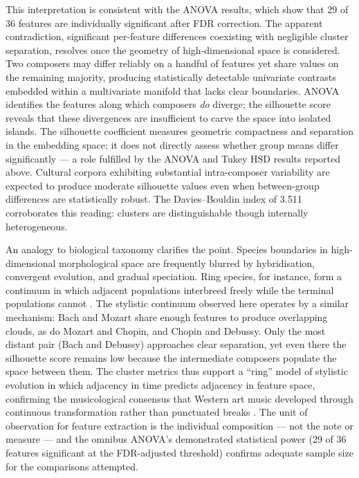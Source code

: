 \documentclass[]{interact}
\theoremstyle{plain}
\theoremstyle{definition}
\theoremstyle{remark}
\begin{document}
This interpretation is consistent with the ANOVA results, which show
that 29 of 36 features are individually significant after FDR
correction. The apparent contradiction, significant per-feature
differences coexisting with negligible cluster separation, resolves
once the geometry of high-dimensional space is considered. Two
composers may differ reliably on a handful of features yet share
values on the remaining majority, producing statistically detectable
univariate contrasts embedded within a multivariate manifold that
lacks clear boundaries. ANOVA identifies the features along which
composers \emph{do} diverge; the silhouette score reveals that
these divergences are insufficient to carve the space into isolated
islands.
The silhouette coefficient measures geometric compactness and separation
in the embedding space; it does not directly assess whether group means
differ significantly --- a role fulfilled by the ANOVA and Tukey HSD
results reported above. Cultural corpora exhibiting substantial
intra-composer variability are expected to produce moderate silhouette
values even when between-group differences are statistically robust.
The Davies--Bouldin index of 3.511 corroborates this reading: clusters
are distinguishable though internally heterogeneous.

An analogy to biological taxonomy clarifies the point. Species
boundaries in high-dimensional morphological space are frequently
blurred by hybridisation, convergent evolution, and gradual
speciation. Ring species, for instance, form a continuum in which
adjacent populations interbreed freely while the terminal populations
cannot \citep{Irwin2001}. The stylistic continuum observed
here operates by a similar mechanism: Bach and Mozart share enough
features to produce overlapping clouds, as do Mozart and Chopin,
and Chopin and Debussy. Only the most distant pair (Bach and
Debussy) approaches clear separation, yet even there the silhouette
score remains low because the intermediate composers populate the
space between them. The cluster metrics thus support a ``ring''
model of stylistic evolution in which adjacency in time predicts
adjacency in feature space, confirming the musicological consensus
that Western art music developed through continuous transformation
rather than punctuated breaks \citep{Meyer1989}.
The unit of observation for feature extraction is the individual
composition --- not the note or measure --- and the omnibus ANOVA's
demonstrated statistical power (29 of 36 features significant at the
FDR-adjusted threshold) confirms adequate sample size for the
comparisons attempted.
\end{document}
